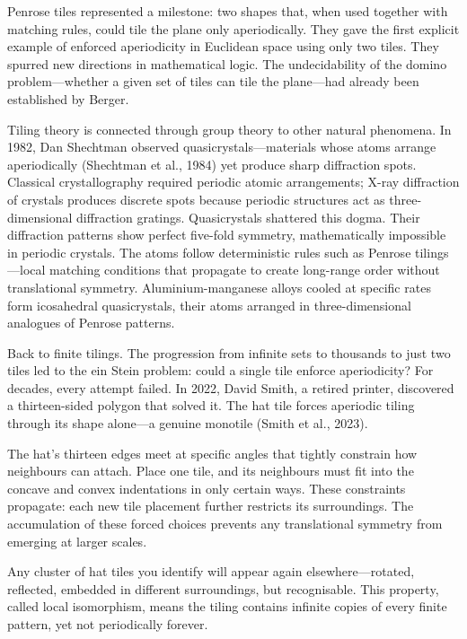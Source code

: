 Penrose tiles represented a milestone: two shapes that, when used together with matching rules, could tile the plane only aperiodically. They gave the first explicit example of enforced aperiodicity in Euclidean space using only two tiles. They spurred new directions in mathematical logic. The undecidability of the domino problem—whether a given set of tiles can tile the plane—had already been established by Berger.

Tiling theory is connected through group theory to other natural phenomena. In 1982, Dan Shechtman observed quasicrystals—materials whose atoms arrange aperiodically (Shechtman et al., 1984) yet produce sharp diffraction spots. Classical crystallography required periodic atomic arrangements; X-ray diffraction of crystals produces discrete spots because periodic structures act as three-dimensional diffraction gratings. Quasicrystals shattered this dogma. Their diffraction patterns show perfect five-fold symmetry, mathematically impossible in periodic crystals. The atoms follow deterministic rules such as Penrose tilings—local matching conditions that propagate to create long-range order without translational symmetry. Aluminium-manganese alloys cooled at specific rates form icosahedral quasicrystals, their atoms arranged in three-dimensional analogues of Penrose patterns.

Back to finite tilings. The progression from infinite sets to thousands to just two tiles led to the \QSOpen{}ein Stein\QSClose{} problem: could a single tile enforce aperiodicity? For decades, every attempt failed. In 2022, David Smith, a retired printer, discovered a thirteen-sided polygon that solved it. The \QSOpen{}hat\QSClose{} tile forces aperiodic tiling through its shape alone—a genuine monotile (Smith et al., 2023).

The hat's thirteen edges meet at specific angles that tightly constrain how neighbours can attach. Place one tile, and its neighbours must fit into the concave and convex indentations in only certain ways. These constraints propagate: each new tile placement further restricts its surroundings. The accumulation of these forced choices prevents any translational symmetry from emerging at larger scales.

Any cluster of hat tiles you identify will appear again elsewhere—rotated, reflected, embedded in different surroundings, but recognisable. This property, called local isomorphism, means the tiling contains infinite copies of every finite pattern, yet not periodically forever.

